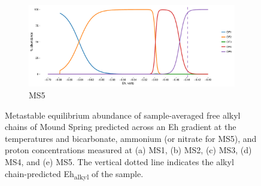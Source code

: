 \begin{figure}[h]\ContinuedFloat

    \begin{subfigure}[b]{\linewidth}
    	\includegraphics[width=\linewidth]{"figs_app2/Mound OF5_thermo"}
    	\caption{MS5}
        \label{fig:MS5_thermo}
    \end{subfigure}
    
    \caption[Metastable equilibrium abundance of sample-averaged free alkyl chains of Mound Spring]{Metastable equilibrium abundance of sample-averaged free alkyl chains of Mound Spring predicted across an Eh gradient at the temperatures and bicarbonate, ammonium (or nitrate for MS5), and proton concentrations measured at (a) MS1, (b) MS2, (c) MS3, (d) MS4, and (e) MS5. The vertical dotted line indicates the alkyl chain-predicted Eh\textsubscript{alkyl} of the sample.}
    \label{fig:mound_thermo}
\end{figure}
\doublespace
\clearpage





